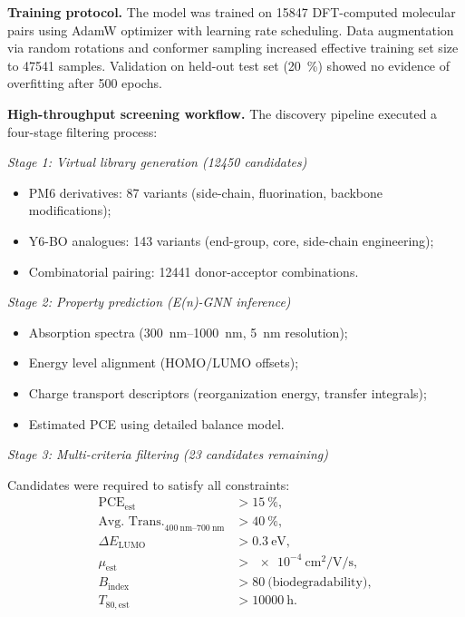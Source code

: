 \textbf{Training protocol.} The model was trained on \num{15847} DFT-computed molecular pairs using AdamW optimizer with learning rate scheduling. Data augmentation via random rotations and conformer sampling increased effective training set size to \num{47541} samples. Validation on held-out test set (\SI{20}{\percent}) showed no evidence of overfitting after \num{500} epochs.

\textbf{High-throughput screening workflow.} The discovery pipeline executed a four-stage filtering process:

\textit{Stage 1: Virtual library generation (\num{12450} candidates)}
\begin{itemize}
    \item PM6 derivatives: \num{87} variants (side-chain, fluorination, backbone modifications);
    \item Y6-BO analogues: \num{143} variants (end-group, core, side-chain engineering);
    \item Combinatorial pairing: \num{12441} donor-acceptor combinations.
\end{itemize}

\textit{Stage 2: Property prediction (E(n)-GNN inference)}
\begin{itemize}
    \item Absorption spectra (\SIrange{300}{1000}{\nano\meter}, \SI{5}{\nano\meter} resolution);
    \item Energy level alignment (HOMO/LUMO offsets);
    \item Charge transport descriptors (reorganization energy, transfer integrals);
    \item Estimated PCE using detailed balance model.
\end{itemize}

\textit{Stage 3: Multi-criteria filtering (23 candidates remaining)}

Candidates were required to satisfy all constraints:
\begin{align}
    \mathrm{PCE}_{\mathrm{est}} &> \SI{15}{\percent}, \label{eq:filter_pce} \\
    \text{Avg. Trans.}_{\SIrange{400}{700}{\nano\meter}} &> \SI{40}{\percent}, \label{eq:filter_trans} \\
    \Delta E_{\mathrm{LUMO}} &> \SI{0.3}{\electronvolt}, \label{eq:filter_lumo} \\
    \mu_{\mathrm{est}} &> \SI{e-4}{\centi\meter\squared\per\volt\per\second}, \label{eq:filter_mu} \\
    B_{\mathrm{index}} &> \num{80}~\text{(biodegradability)}, \label{eq:filter_bio} \\
    T_{80, \mathrm{est}} &> \SI{10000}{\hour}. \label{eq:filter_stability}
\end{align}

